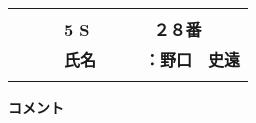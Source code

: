 \begin{center}
  \vspace*{0.55cm}
  
  \begin{tabular}{|p{11cm}|} \hline
    \\
    {\large\textbf{　　　5 S　　　　２８番}} \vspace*{0.25cm} \\
    {\large\textbf{　　　氏名　　　：野口　史遠 }}            \\
    \\ \hline
  \end{tabular}
  
  \vspace*{0.55cm}
  
  \begin{itembox}[r]{\textbf{コメント}}
    \hspace*{12.5cm} \\
    \hspace*{12.5cm} \\
    \hspace*{12.5cm} \\
    \hspace*{12.5cm} \\
    \hspace*{12.5cm} \\
    \hspace*{12.5cm} \\
    \hspace*{12.5cm} \\
    \hspace*{12.5cm} \\
    \hspace*{12.5cm} \\
    \hspace*{12.5cm} \\
    \hspace*{12.5cm} \\
    \hspace*{12.5cm} \\
  \end{itembox}
\end{center}
\renewcommand{\arraystretch}{1}
